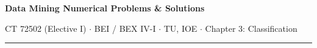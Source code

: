 \documentclass[10pt]{article}
\begin{document}
{\LARGE\bfseries Data Mining \gap\textcolor{sub}{Numerical Problems \& Solutions}}\par
{\footnotesize\color{sub} CT 72502 (Elective I) $\cdot$ BEI / BEX IV-I $\cdot$ TU, IOE $\cdot$ Chapter 3: Classification}
\vspace{3pt}\hrule\vspace{4pt}




\end{document}
